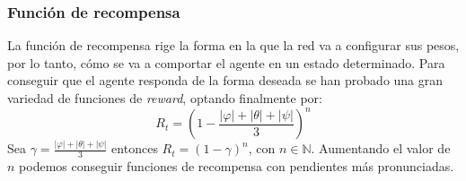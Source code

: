 

\subsubsection{Función de recompensa}
La función de recompensa rige la forma en la que la red va a configurar sus pesos, por lo tanto, cómo se va a comportar el agente en un estado determinado. Para conseguir que el agente responda de la forma deseada se han probado una gran variedad de funciones de \textit{reward}, optando finalmente por:
\begin{equation}
	R_t = \left( 1-\frac{|\varphi|  + |\theta| + |\psi|}{3}\right)^n
\end{equation}
Sea $\gamma= \frac{|\varphi|  + |\theta| + |\psi|}{3} $ entonces $R_t = (1- \gamma)^n$, con $n \in \mathbb{N}$. Aumentando el valor de $n$ podemos conseguir funciones de recompensa con pendientes más pronunciadas.


